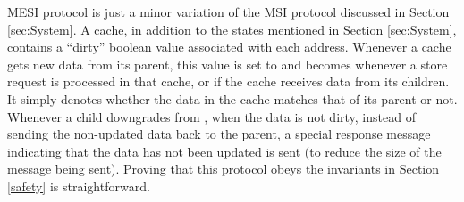 %
%
%
%

MESI protocol is just a minor variation of the MSI protocol discussed in Section \ref{sec:System}.
A cache, in addition to the states mentioned in Section
\ref{sec:System}, contains a ``dirty'' boolean value associated with each
address.  Whenever a cache gets new data from its parent, this value is set to
\False{} and becomes \True{} whenever a store request is processed in that
cache, or if the cache receives data from its children. It simply denotes
whether the data in the cache matches that of its parent or not.  Whenever a
child downgrades from \Mo{}, when the data is not dirty, instead of sending the
non-updated data back to the parent, a special response message indicating that
the data has not been updated is sent (to reduce the size of the message being
sent). Proving that this protocol obeys the invariants in Section \ref{safety}
is straightforward.


